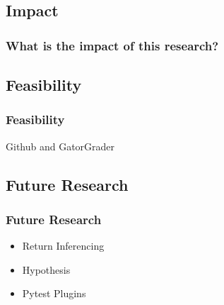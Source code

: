 \subsection{Impact}
\begin{frame}
  \frametitle{What is the impact of this research?}
  \begin{center}
    \begin{table}[htbp]
      \centering
    \end{table}
  \end{center}
\end{frame}

\subsection{Feasibility}
\begin{frame}
  \frametitle{Feasibility}
  \begin{center}
    \huge{Github and GatorGrader}
  \end{center}
\end{frame}

\subsection{Future Research}
\begin{frame}
  \frametitle{Future Research}
  \begin{center}
    \begin{itemize}
      \item {Return Inferencing}
      \item {Hypothesis}
      \item {Pytest Plugins}
    \end{itemize}
   
\end{center}
\end{frame}
